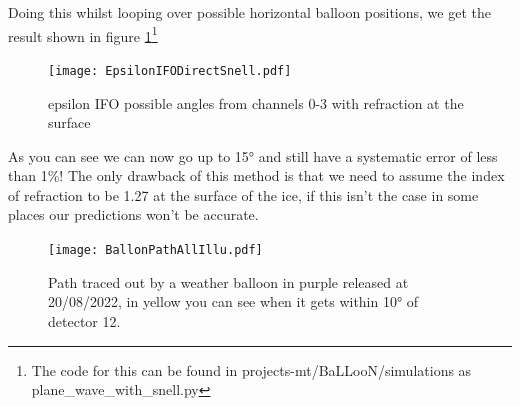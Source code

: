 Doing this whilst looping over possible horizontal balloon positions, we get
the result shown in figure \ref{fig:EpsilonIFODirectSnell}\footnote{The code
for this can be found in projects-mt/BaLLooN/simulations as
plane\_wave\_with\_snell.py}
\begin{figure}
	\centering
	\texttt{[image: EpsilonIFODirectSnell.pdf]}
	\caption{epsilon IFO possible angles from channels 0-3 with refraction at the surface}
	\label{fig:EpsilonIFODirectSnell}
\end{figure}
As you can see we can now go up to 15° and still have a systematic error of less than 1\%!  The
only drawback of this method is that we need to assume the index of refraction
to be 1.27 at the surface of the ice, if this isn't the case in some places our
predictions won't be accurate.

\begin{figure}
  \centering
	\texttt{[image: BallonPathAllIllu.pdf]}
  \caption{Path traced out by a weather balloon in purple released at 20/08/2022, in yellow you can see when it
  gets within 10° of detector 12.}
  \label{fig:ExampleBalloonPathCrossing12}
\end{figure}


